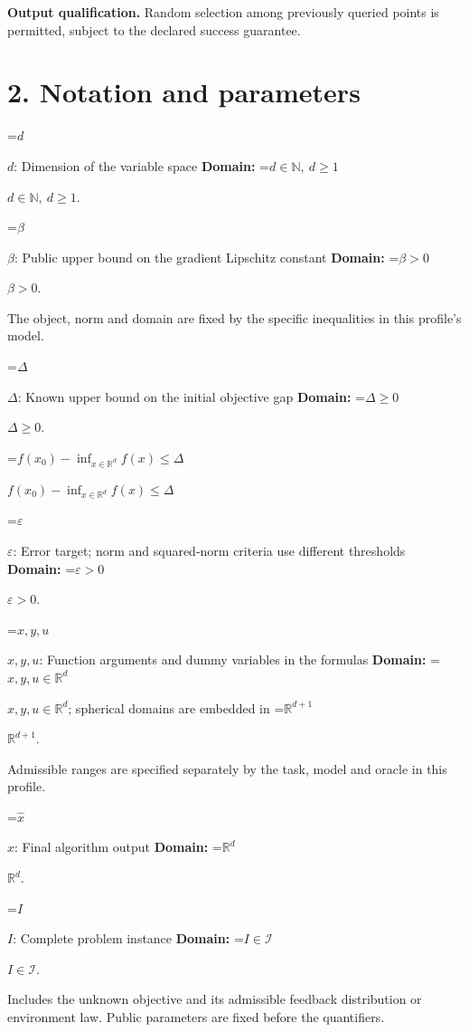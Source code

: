\documentclass[10pt,a4paper]{article}
\newcommand{\AtlasMath}[1]{\par\begingroup\centering\setbox0=\hbox{$\displaystyle #1$}\ifdim\wd0>1.4\linewidth\typeout{ATLAS WIDE FORMULA: \the\wd0}\fi\ifdim\wd0>\linewidth\resizebox{\linewidth}{!}{\box0}\else\box0\fi\par\endgroup}
\newcommand{\AtlasInlineMath}[1]{\begingroup\setbox0=\hbox{$#1$}\ifdim\wd0>.4\linewidth\endgroup\AtlasMath{#1}\else\endgroup$#1$\fi}
\begin{document}
\textbf{Output qualification.} Random selection among previously queried points is permitted, subject to the declared success guarantee.



\section{2. Notation and parameters}


\AtlasInlineMath{d}: Dimension of the variable space \textbf{Domain:} \AtlasInlineMath{d\in\mathbb{N},\ d\ge1}.



\AtlasInlineMath{\beta}: Public upper bound on the gradient Lipschitz constant \textbf{Domain:} \AtlasInlineMath{\beta>0}.



The object, norm and domain are fixed by the specific inequalities in this profile's model.



\AtlasInlineMath{\Delta}: Known upper bound on the initial objective gap \textbf{Domain:} \AtlasInlineMath{\Delta\ge0}.



\AtlasInlineMath{f(x_0)-\inf_{x\in\mathbb{R}^d}f(x)\le\Delta}



\AtlasInlineMath{\varepsilon}: Error target; norm and squared-norm criteria use different thresholds \textbf{Domain:} \AtlasInlineMath{\varepsilon>0}.



\AtlasInlineMath{x,y,u}: Function arguments and dummy variables in the formulas \textbf{Domain:} \AtlasInlineMath{x,y,u\in\mathbb{R}^d}; spherical domains are embedded in \AtlasInlineMath{\mathbb{R}^{d+1}}.



Admissible ranges are specified separately by the task, model and oracle in this profile.



\AtlasInlineMath{\widehat{x}}: Final algorithm output \textbf{Domain:} \AtlasInlineMath{\mathbb{R}^d}.



\AtlasInlineMath{I}: Complete problem instance \textbf{Domain:} \AtlasInlineMath{I\in\mathcal{I}}.



Includes the unknown objective and its admissible feedback distribution or environment law. Public parameters are fixed before the quantifiers.
\end{document}
